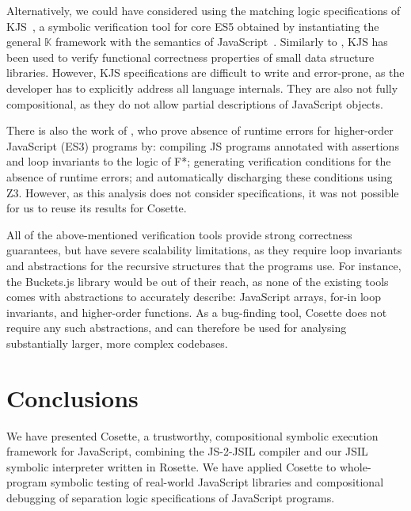 \documentclass[sigconf, review]{acmart}
\newcommand{\cosette}{Cosette\xspace}
\begin{document}

Alternatively, we could have considered using the matching logic specifications of KJS~\cite{stefanescu:oopsla:2016}, a symbolic verification tool for core ES5 obtained by instantiating the general $\mathbb{K}$ framework with the semantics of JavaScript~\cite{Park:2015}. Similarly to \javert, KJS has been used to verify functional correctness properties of small data structure libraries.
However, KJS specifications are difficult to write and error-prone, as the developer has to  explicitly address all language internals. They are also not fully compositional, as they do not allow partial descriptions of JavaScript objects. 

There is also the work of \citet{swamy:pldi:2013}, who prove absence of runtime errors for higher-order JavaScript (ES3) programs by: compiling JS programs annotated with assertions and loop invariants to the logic of F*; generating verification conditions for the absence of runtime errors; and automatically discharging these conditions using Z3. However, as this analysis does not consider specifications, it was not possible for us to reuse its results for \cosette. 

All of the above-mentioned verification tools provide strong correctness guarantees, but have severe scalability limitations, as they require loop invariants and abstractions for the recursive structures that the programs use. For instance, the Buckets.js library would be out of their reach, as none of the existing tools comes with abstractions to accurately describe: JavaScript arrays, for-in loop invariants, and higher-order functions.  As a bug-finding tool, Cosette does not require any such abstractions, and can therefore be used for analysing substantially larger, more complex codebases.


\section{Conclusions}

We have presented \cosette, a trustworthy, compositional symbolic execution
framework for JavaScript, combining the JS-2-JSIL compiler
and our JSIL symbolic interpreter written in Rosette. We
have applied Cosette to whole-program symbolic testing of real-world
JavaScript libraries and compositional debugging of separation logic
specifications of JavaScript programs.
\end{document}
